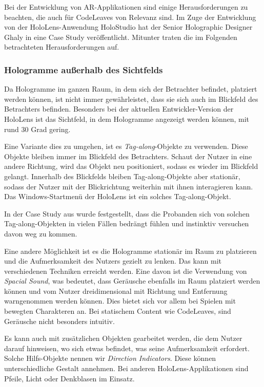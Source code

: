 Bei der Entwicklung von AR-Applikationen sind einige Herausforderungen zu beachten, die auch für CodeLeaves von Relevanz sind. Im Zuge der Entwicklung von der HoloLens-Anwendung HoloStudio hat der Senior Holographic Designer Ghaly in \cite{windows2017casestudy3} eine Case Study veröffentlicht. Mitunter traten die im Folgenden betrachteten Herausforderungen auf.

\subsubsection*{Hologramme außerhalb des Sichtfelds}

Da Hologramme im ganzen Raum, in dem sich der Betrachter befindet, platziert werden können, ist nicht immer gewährleistet, dass sie sich auch im Blickfeld des Betrachters befinden. Besonders bei der aktuellen Entwickler-Version der HoloLens ist das Sichtfeld, in dem Hologramme angezeigt werden können, mit rund 30 Grad \cite{czerulla2017microsoft} gering.

Eine Variante dies zu umgehen, ist es \textit{Tag-along}-Objekte zu verwenden. Diese Objekte bleiben immer im Blickfeld des Betrachters. Schaut der Nutzer in eine andere Richtung, wird das Objekt neu positioniert, sodass es wieder im Blickfeld gelangt. Innerhalb des Blickfelds bleiben Tag-along-Objekte aber stationär, sodass der Nutzer mit der Blickrichtung weiterhin mit ihnen interagieren kann. Das Windows-Startmenü der HoloLens ist ein solches Tag-along-Objekt.

In der Case Study aus \cite{windows2017casestudy3} wurde festgestellt, dass die Probanden sich von solchen Tag-along-Objekten in vielen Fällen bedrängt fühlen und instinktiv versuchen davon weg zu kommen.

Eine andere Möglichkeit ist es die Hologramme stationär im Raum zu platzieren und die Aufmerksamkeit des Nutzers gezielt zu lenken. Das kann mit verschiedenen Techniken erreicht werden. Eine davon ist die Verwendung von \textit{Spacial Sound}, was bedeutet, dass Geräusche ebenfalls im Raum platziert werden können und vom Nutzer dreidimensional mit Richtung und Entfernung warngenommen werden können. Dies bietet sich vor allem bei Spielen mit bewegten Charakteren an. Bei statischem Content wie CodeLeaves, sind Geräusche nicht besonders intuitiv.

Es kann auch mit zusätzlichen Objekten gearbeitet werden, die dem Nutzer darauf hinweisen, wo sich etwas befindet, was seine Aufmerksamkeit erfordert. Solche Hilfs-Objekte nennen wir \textit{Direction Indicators}. Diese können unterschiedliche Gestalt annehmen. Bei anderen HoloLens-Applikationen sind Pfeile, Licht oder Denkblasen im Einsatz.

